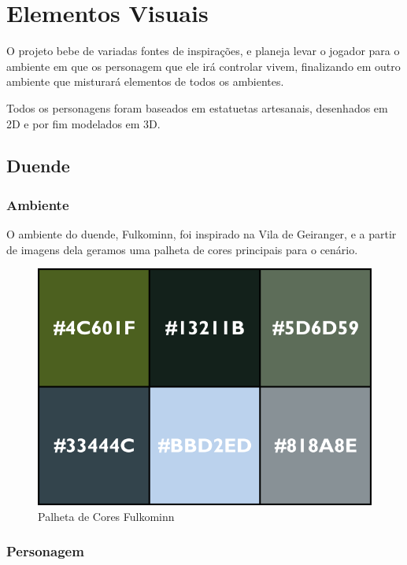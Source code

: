 
\section{Elementos Visuais}
O projeto bebe de variadas fontes de inspirações, e planeja levar o jogador para o ambiente em que os personagem que ele irá controlar vivem, finalizando em outro ambiente que misturará elementos de todos os ambientes.


Todos os personagens foram baseados em estatuetas artesanais, desenhados em 2D e por fim modelados em 3D.

\subsection{Duende}
\subsubsection{Ambiente}
O ambiente do duende, Fulkominn, foi inspirado na Vila de Geiranger, e a partir de imagens dela geramos uma palheta de cores principais para o cenário.

\begin{figure}[htb]
	\caption{\label{fig_palhetaFulkominn}Palheta de Cores Fulkominn}
	\begin{center}
	    \includegraphics[width=\textwidth/2]{imagens/PaletaGeiranger.png}
	\end{center}
\end{figure}

\subsubsection{Personagem}

